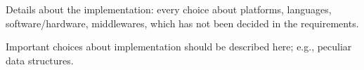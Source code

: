 Details about the implementation: every choice about platforms,
languages, software/hardware, middlewares, which has not been decided
in the requirements.

Important choices about implementation should be described here;
e.g., peculiar data structures.

